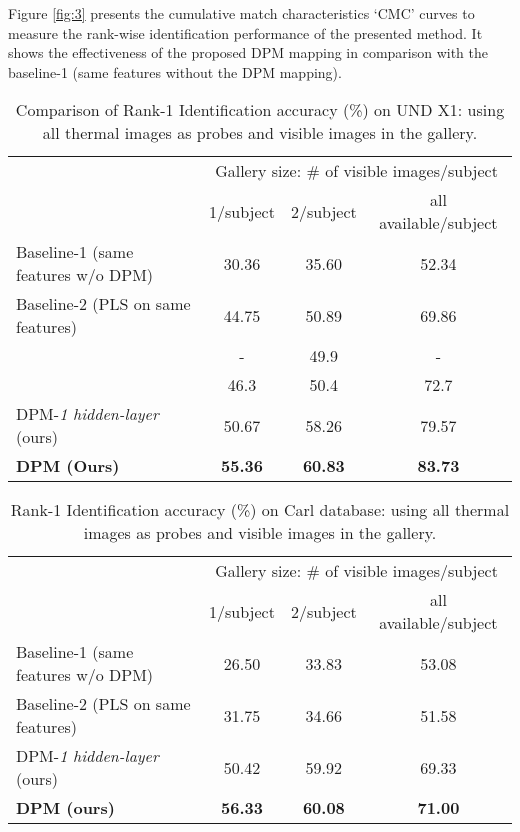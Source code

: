 \documentclass[smallextended,natbib]{svjour3}       \usepackage{graphicx}
\begin{document}
Figure \ref{fig:3} presents the cumulative match characteristics `CMC' curves to measure the rank-wise identification performance of the presented method. It shows the effectiveness of the proposed DPM mapping in comparison with the baseline-1 (same features without the DPM mapping).
\begin{table}[t]
\centering
\begin{tabular}{@{}lccc@{}}
\toprule
                                 & \multicolumn{3}{c}{Gallery size: \# of visible images/subject} \\ \cmidrule(l){2-4} 
                                 & 1/subject         & 2/subject        & all available/subject   \\ \midrule
Baseline-1 (same features w/o DPM) & 30.36             & 35.60            & 52.34                   \\
Baseline-2 (PLS on same features) & 44.75             & 50.89            & 69.86                   \\
\cite{choi2012} & -                 & 49.9             & -                       \\
\cite{hu2015} & 46.3              & 50.4             & 72.7                    \\
DPM-\textit{1 hidden-layer} (ours)             & 50.67              & 58.26             & 79.57                   
\\
\textbf{DPM  (Ours)}             & \textbf{55.36}    & \textbf{60.83}   & \textbf{83.73}          \\ \bottomrule
\end{tabular}
\caption{Comparison of Rank-1 Identification accuracy (\%) on UND X1: using all thermal images as probes and visible images in the gallery.}
\label{table:1}
\end{table}

\begin{table}[t]
\centering
\begin{tabular}{@{}lccc@{}}
\toprule
                                 & \multicolumn{3}{c}{Gallery size: \# of visible images/subject} \\ \cmidrule(l){2-4} 
                                 & 1/subject         & 2/subject        & all available/subject   \\ \midrule
Baseline-1 (same features w/o DPM) & 26.50             & 33.83            & 53.08                   \\
Baseline-2 (PLS on same features) & 31.75             & 34.66            & 51.58                   \\
DPM-\textit{1 hidden-layer} (ours)             & 50.42              & 59.92             & 69.33                   
\\
\textbf{DPM  (ours)}             & \textbf{56.33}    & \textbf{60.08}   & \textbf{71.00}          \\ \bottomrule
\end{tabular}
\caption{Rank-1 Identification accuracy (\%) on Carl database: using all thermal images as probes and visible images in the gallery.}
\label{table:2}
\end{table}
\end{document}
